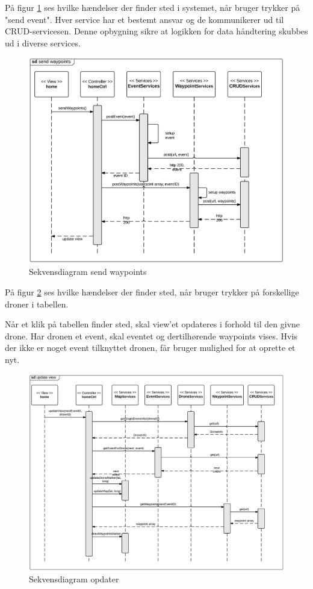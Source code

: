 \newpage
På figur \ref{fig:send_waypoints} ses hvilke hændelser der finder sted i systemet, når bruger trykker på "send event". Hver service har et bestemt ansvar og de kommunikerer ud til CRUD-servicesen. Denne opbygning sikre at logikken for data håndtering skubbes ud i diverse services. 
\begin{figure}[H]
	\centering
	\includegraphics[width=1\textwidth]{Billeder/sekvens/sd_send_waypoints.png}
	\caption{Sekvensdiagram send waypoints}
	\label{fig:send_waypoints}
\end{figure}

\newpage
På figur \ref{fig:update_view} ses hvilke hændelser der finder sted, når bruger trykker på forskellige droner i tabellen. 

Når et klik på tabellen finder sted, skal view'et opdateres i forhold til den givne drone. Har dronen et event, skal eventet og dertilhørende waypoints vises. Hvis der ikke er noget event tilknyttet dronen, får bruger mulighed for at oprette et nyt.
\begin{figure}[H]
	\centering
	\includegraphics[width=1\textwidth]{Billeder/sekvens/sd_update_view.png}
	\caption{Sekvensdiagram opdater }
	\label{fig:update_view}
\end{figure}

